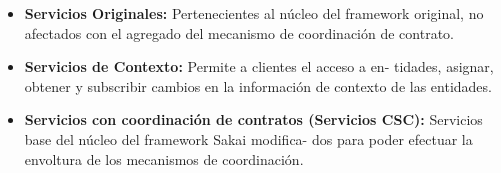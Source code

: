 \begin{itemize}

\item \textbf{Servicios Originales:} Pertenecientes al núcleo del framework original, no afectados con el agregado del mecanismo
de coordinación de contrato.

\item \textbf{Servicios de Contexto:} Permite a clientes el acceso a en-
tidades, asignar, obtener y subscribir cambios en la información de contexto de las entidades.

\item \textbf{Servicios con coordinación de contratos (Servicios CSC):}
Servicios base del núcleo del framework Sakai modifica-
dos para poder efectuar la envoltura de los mecanismos de
coordinación.


\end{itemize}

